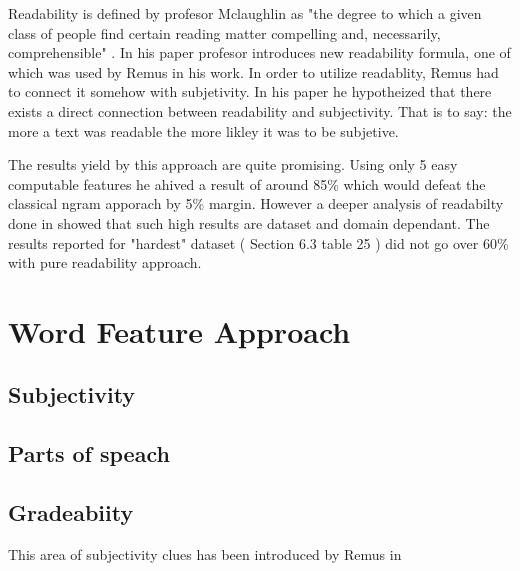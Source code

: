Readability is defined by profesor Mclaughlin as "the degree to which a given class of people find certain reading matter compelling and,
necessarily, comprehensible" \cite{Mclaughlin1969}. In his paper profesor introduces new readability formula, one of which was used by Remus 
in his work. In order to utilize readablity, Remus had to connect it somehow with subjetivity. In his paper \cite{remus2011} he hypotheized that
there exists a direct connection between readability and subjectivity. That is to say: the more a text was readable the more likley it was to
be subjetive. 

The results yield by this approach are quite promising. Using only 5 easy computable features he ahived a result of around 85\% 
which would defeat the classical  ngram apporach by 5\% margin. However a deeper analysis of readabilty done in \cite{remus2015} showed
that such high results are dataset and domain dependant. The results reported for "hardest" dataset ( Section 6.3 table 25 ) 
did not go over 60\% with pure readability approach. 


\section{ Word Feature Approach }

\subsection{ Subjectivity }

\subsection{ Parts of speach }

\subsection{ Gradeabiity }

 This area of  subjectivity clues has been introduced by Remus in \cite{remus2011} 




